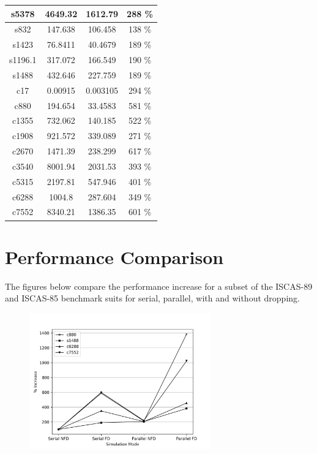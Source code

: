 \documentclass[a4paper,12pt]{article}
\begin{document}
\begin{center}
\begin{tabular}{||c c c c||}
\hline
s5378 & 4649.32 & 1612.79 & 288 \% \\ 
\hline
s832 & 147.638 & 106.458 & 138 \% \\ 
\hline
s1423 & 76.8411 & 40.4679 & 189 \% \\ 
\hline
s1196.1 & 317.072 & 166.549 & 190 \% \\ 
\hline
s1488 & 432.646 & 227.759 & 189 \% \\ 
\hline
c17 & 0.00915 & 0.003105 & 294 \% \\ 
\hline
c880 & 194.654 & 33.4583 & 581 \% \\ 
\hline
c1355 & 732.062 & 140.185 & 522 \% \\ 
\hline
c1908 & 921.572 & 339.089 & 271 \% \\ 
\hline
c2670 & 1471.39 & 238.299 & 617 \% \\ 
\hline
c3540 & 8001.94 & 2031.53 & 393 \% \\ 
\hline
c5315 & 2197.81 & 547.946 & 401 \% \\ 
\hline
c6288 & 1004.8 & 287.604 & 349 \% \\ 
\hline
c7552 & 8340.21 & 1386.35 & 601 \% \\ 
\hline






\end{tabular}
\end{center}



\clearpage

\section*{Performance Comparison}
The figures below compare the performance increase for a subset of the ISCAS-89 and ISCAS-85 benchmark suits for serial, parallel, with and without dropping. 

\begin{figure}[h]  
  \centering
    \includegraphics[width=0.7\textwidth]{figure.png}
\end{figure}
\end{document}
